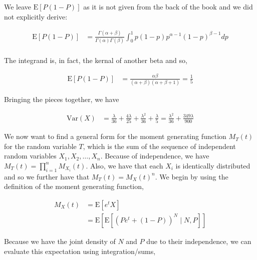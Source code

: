 \documentclass[11pt]{article}
\begin{document}
We leave $\mathrm{E}[P(1-P)]$ as it is not given from the back of the
book and we did not explicitly derive:

\begin{align*}
  \mathrm{E}[P(1-P)] &= \frac{\Gamma(\alpha + \beta)}{\Gamma(\alpha)
                       \Gamma(\beta)} \int_0^1 p(1-p)
                       p^{\alpha-1}(1-p)^{\beta-1} dp \\
\end{align*}

The integrand is, in fact, the kernal of another beta and so,

\begin{align*}
  \mathrm{E}[P(1-P)] &= \frac{\alpha \beta}{(\alpha + \beta)(\alpha +
                       \beta + 1)} = \frac{1}{5}
\end{align*}

Bringing the pieces together, we have

\begin{align*}
  \mathrm{Var}(X) &= \frac{\lambda}{36} + \frac{4 \lambda}{25} +
                    \frac{\lambda^2}{36} + \frac{\lambda}{5} =
                    \frac{\lambda^2}{36} + \frac{349\lambda}{900}
\end{align*}

We now want to find a general form for the moment generating function
$M_T(t)$ for the random variable $T$, which is the sum of the sequence
of independent random variables $X_1, X_2, \dots, X_n$.  Because of
independence, we have $M_T(t) = \prod_{i=1}^n M_{X_i}(t)$.  Also, we
have that each $X_i$ is identically distributed and so we further have
that $M_T(t) = M_X(t)^n$.  We begin by using the definition of the
moment generating function,

\begin{align*}
  M_X(t) &= \mathrm{E}[e^tX] \\
  &= \mathrm{E}[\mathrm{E}[(Pe^t + (1-P))^N \mid N,P]]
\end{align*}

Because we have the joint density of $N$ and $P$ due to their
independence, we can evaluate this expectation using integration/sums,
\end{document}
